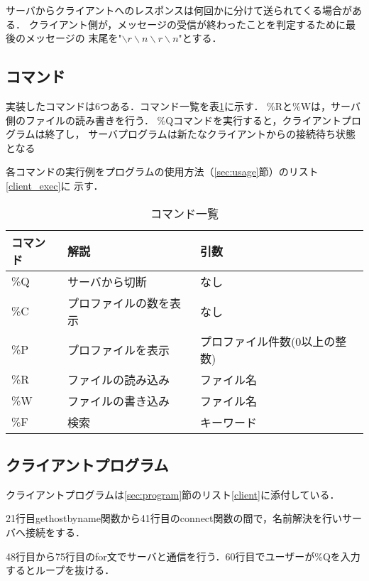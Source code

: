 \documentclass[11pt]{jarticle}
\begin{document}
サーバからクライアントへのレスポンスは何回かに分けて送られてくる場合がある．
クライアント側が，メッセージの受信が終わったことを判定するために最後のメッセージの
末尾を"$\backslash r\backslash n\backslash r\backslash n$"とする．

\subsection{コマンド} \label{sec:command}

実装したコマンドは6つある．コマンド一覧を表\ref{table:command}に示す．
\%Rと\%Wは，サーバ側のファイルの読み書きを行う．
\%Qコマンドを実行すると，クライアントプログラムは終了し，
サーバプログラムは新たなクライアントからの接続待ち状態となる

各コマンドの実行例をプログラムの使用方法（\ref{sec:usage}節）のリスト\ref{client_exec}に
示す．

\begin{table}[h] \caption{コマンド一覧} \label{table:command}
    \begin{center}
        \begin{tabular}{l|l|l} \hline
            コマンド & 解説 & 引数 \\ \hline \hline
            \%Q & サーバから切断 & なし \\ 
            \%C & プロファイルの数を表示 & なし \\ 
            \%P & プロファイルを表示 & プロファイル件数(0以上の整数) \\
            \%R & ファイルの読み込み & ファイル名 \\
            \%W & ファイルの書き込み & ファイル名 \\
            \%F & 検索 & キーワード \\ \hline
        \end{tabular}
    \end{center}
\end{table}

\subsection{クライアントプログラム}

クライアントプログラムは\ref{sec:program}節のリスト\ref{client}に添付している．

21行目gethostbyname関数から41行目のconnect関数の間で，名前解決を行いサーバへ接続をする．

48行目から75行目のfor文でサーバと通信を行う．60行目でユーザーが\%Qを入力するとループを抜ける．
\end{document}

